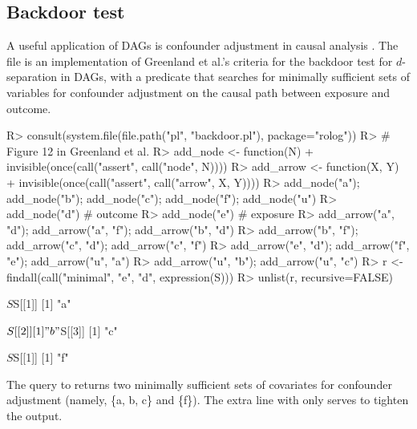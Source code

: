 \documentclass[article]{jss}
\begin{document}
\subsection{Backdoor test}

A useful application of DAGs is confounder adjustment in causal 
analysis \citep{greenland1999,ggdag}. The  
file  is an implementation of Greenland et al.'s criteria for
the backdoor test for $d$-separation in DAGs, with a predicate 
that searches for minimally sufficient sets of variables for confounder
adjustment on the causal path between exposure and outcome.

\begin{Schunk}
\begin{Sinput}
R> consult(system.file(file.path("pl", "backdoor.pl"), package="rolog"))
R> # Figure 12 in Greenland et al.
R> add_node <- function(N)
+  	invisible(once(call("assert", call("node", N))))
R> add_arrow <- function(X, Y)
+  	invisible(once(call("assert", call("arrow", X, Y))))
R> add_node("a"); add_node("b"); add_node("c"); add_node("f"); add_node("u")
R> add_node("d") # outcome
R> add_node("e") # exposure
R> add_arrow("a", "d"); add_arrow("a", "f"); add_arrow("b", "d")
R> add_arrow("b", "f"); add_arrow("c", "d"); add_arrow("c", "f")
R> add_arrow("e", "d"); add_arrow("f", "e"); add_arrow("u", "a")
R> add_arrow("u", "b"); add_arrow("u", "c")
R> r <- findall(call("minimal", "e", "d", expression(S)))
R> unlist(r, recursive=FALSE)
\end{Sinput}
\begin{Soutput}
$S
$S[[1]]
[1] "a"

$S[[2]]
[1] "b"

$S[[3]]
[1] "c"


$S
$S[[1]]
[1] "f"
\end{Soutput}
\end{Schunk}

The query to  returns two minimally sufficient sets of
covariates for confounder adjustment (namely, \{a, b, c\} and \{f\}). 
The extra line with  only serves to tighten the output.
\end{document}
